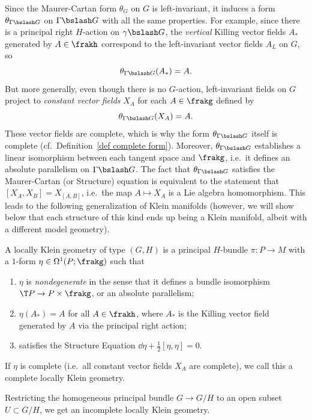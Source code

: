 Since the Maurer-Cartan form $\theta_G$ on $G$ is left-invariant, it induces a form $\theta_{\Gamma\bslash G}$ on $\Gamma\bslash G$ with all the same properties. For example, since there is a principal right $H$-action on $\gamma\bslash G$, the \emph{vertical} Killing vector fields $A_\ast$ generated by $A\in\frakh$ correspond to the left-invariant vector fields $A_L$ on $G$, so 
\[\theta_{\Gamma\bslash G}(A_\ast)=A.\]
But more generally, even though there is no $G$-action, left-invariant fields on $G$ project to \emph{constant vector fields} $X_A$ for each $A\in \frakg$ defined by 
\[\theta_{\Gamma\bslash G}(X_A)=A.\]
These vector fields are complete, which is why the form $\theta_{\Gamma\bslash G}$ itself is complete (cf.\ Definition~\ref{def complete form}). Moreover, $\theta_{\Gamma\bslash G}$ establishes a linear isomorphism between each tangent space and $\frakg$, i.e.\ it defines an absolute parallelism on $\Gamma\bslash G$.  The fact that $\theta_{\Gamma\bslash G}$ satisfies the Maurer-Cartan (or Structure) equation is equivalent to the statement that $[X_A,X_B]=X_{[A,B]}$, i.e.\ the map $A\mapsto X_A$ is a Lie algebra homomorphism. This leads to the following generalization of Klein manifolds (however, we will show below that each structure of this kind ends up being a Klein manifold, albeit with a different model geometry).


\begin{defn}
    A locally Klein geometry of type $(G,H)$ is a principal $H$-bundle $\pi:P\to M$ with a $1$-form $\eta\in \Omega^1(P;\frakg)$ such that 
    \begin{enumerate}
        \item $\eta$ is \emph{nondegenerate} in the sense that it defines a bundle isomorphism $\T P\to P\times \frakg$, or an absolute parallelism;
        \item $\eta(A_\ast)=A$ for all $A\in\frakh$, where $A_\ast$ is the Killing vector field generated by $A$ via the principal right action;
        \item satisfies the Structure Equation $\dd\eta+\frac12[\eta,\eta]=0$.
    \end{enumerate}
    If $\eta$ is complete (i.e.\ all constant vector fields $X_A$ are complete), we call this a complete locally Klein geometry.
\end{defn}

\begin{example}
    Restricting the homogeneous principal bundle $G\to G\slash H$ to an open subset $U\subset G\slash H$, we get an incomplete locally Klein geometry.
\end{example}

